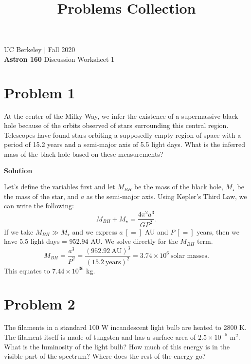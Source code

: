 \documentclass[12pt]{article}
\title{Problems Collection}
\begin{document}
UC Berkeley | Fall 2020 \\
\textbf{Astron 160} Discussion \hfill Worksheet 1
\vspace{-0.5cm}

\hrulefill


\section*{Problem 1}
At the center of the Milky Way, we infer the existence of a supermassive black hole because of the orbits observed of stars surrounding this central region. Telescopes have found stars orbiting a supposedly empty region of space with a period of 15.2 years and a semi-major axis of 5.5 light days. What is the inferred mass of the black hole based on these measurements?

\vspace{0.5cm}
\begin{adjustwidth}{2.5em}{0pt}
\begin{siderules}
 {\color{blue} \textbf{Solution}
 
 Let's define the variables first and let $M_{BH}$ be the mass of the black hole, $M_{\star}$ be the mass of the star, and $a$ as the semi-major axis. Using Kepler's Third Law, we can write the following:
 \begin{equation}
 M_{BH} + M_{\star} = \frac{4\pi^2 a^3}{GP^2}.
 \end{equation}
 If we take $M_{BH} \gg M_{\star}$ and we express $a \ [=]$ AU and $P \ [=]$ years, then we have 5.5 light days = 952.94 AU. We solve directly for the $M_{BH}$ term.
 \begin{equation}
 M_{BH} = \frac{a^3}{P^2} = \frac{(952.92 \ \text{AU})^3}{(15.2 \ \text{years})^2} = 3.74 \times 10^6 \ \text{solar masses}.
 \end{equation}
 This equates to $7.44 \times 10^{36}$ kg.
 }
\end{siderules}
\end{adjustwidth}

\section*{Problem 2}
The filaments in a standard 100 W incandescent light bulb are heated to 2800 K. The filament itself is made of tungsten and has a surface area of $2.5 \times 10^{-5}$ m$^2$. What is the luminosity of the light bulb? How much of this energy is in the visible part of the spectrum? Where does the rest of the energy go?
\end{document}
